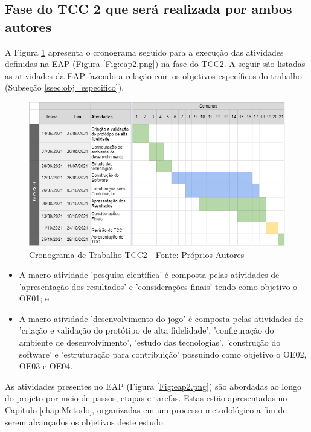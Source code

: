 \subsection{\textcolor{textmodified}{Fase do TCC 2 que será realizada por ambos autores}}
\label{ssec:tcc2}

{\color{textadded}
A Figura \ref{Fig:cronograma_tcc2.png} apresenta o cronograma seguido para a execução das atividades definidas na EAP (Figura \ref{Fig:eap2.png}) na fase do TCC2. A seguir são listadas as atividades da EAP fazendo a relação com os objetivos específicos do trabalho (Subseção \ref{ssec:obj_especifico}).
}

\begin{figure}[htbp]
	\centering
		\includegraphics[keepaspectratio=true,scale=0.81]{figuras/cronograma_tcc2.PNG}
	\caption{\textcolor{textmodified}{Cronograma de Trabalho TCC2 - Fonte: Próprios Autores}}
	\label{Fig:cronograma_tcc2.png}
\end{figure}

{\color{textmodified}
\begin{itemize}
    \item A macro atividade 'pesquisa científica' é composta pelas atividades de 'apresentação dos resultados' e 'considerações finais' tendo como objetivo o OE01; e
    \item A macro atividade 'desenvolvimento do jogo' é composta pelas atividades de 'criação e validação do protótipo de alta fidelidade', 'configuração do ambiente de desenvolvimento', 'estudo das tecnologias', 'construção do software' e 'estruturação para contribuição' possuindo como objetivo o OE02, OE03 e OE04.
\end{itemize}
}

{\color{textmodified}
As atividades presentes no EAP (Figura \ref{Fig:eap2.png}) são abordadas ao longo do projeto por meio de passos, etapas e tarefas. Estas estão apresentadas no Capítulo \ref{chap:Metodo}, organizadas em um processo metodológico a fim de serem alcançados os objetivos deste estudo.}

